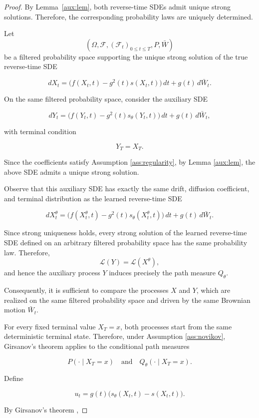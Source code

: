 \documentclass[11pt]{article}
\begin{document}
\begin{proof}
By Lemma~\ref{aux:lem}, both reverse-time SDEs admit unique strong
solutions. Therefore, the corresponding probability laws are uniquely determined. 

Let
\[
(\Omega,\mathcal{F},(\mathcal{F}_t)_{0\le t\le T},P,\bar{W})
\]
be a filtered probability space supporting the unique strong solution of the
true reverse-time SDE

\[
dX_t
=
\bigl(f(X_t,t)-g^2(t)s(X_t,t)\bigr)\,dt
+
g(t)\,d\bar{W}_t.
\]

On the same filtered probability space, consider the auxiliary SDE

\[
dY_t
=
\bigl(f(Y_t,t)-g^2(t)s_\theta(Y_t,t)\bigr)\,dt
+
g(t)\,d\bar{W}_t,
\]

with terminal condition

\[
Y_T=X_T.
\]

Since the coefficients satisfy Assumption \ref{ass:regularity}, by Lemma \ref{aux:lem}, the above SDE admits a unique
strong solution.

Observe that this auxiliary SDE has exactly the same drift, diffusion
coefficient, and terminal distribution as the learned reverse-time SDE

\[
dX_t^\theta
=
\bigl(f(X_t^\theta,t)-g^2(t)s_\theta(X_t^\theta,t)\bigr)\,dt
+
g(t)\,d\bar{W}_t.
\]

Since strong uniqueness holds, every strong solution of the learned
reverse-time SDE defined on an arbitrary filtered probability space has
the same probability law. Therefore,
\[
\mathcal{L}(Y)
=
\mathcal{L}(X^\theta),
\]
and hence the auxiliary process \(Y\) induces precisely the path measure
\(Q_\theta\).

Consequently, it is sufficient to compare the processes $X$ and $Y$, which
are realized on the same filtered probability space and driven by the same
Brownian motion $\bar{W}_t$.

For every fixed terminal value $X_T=x$, both processes start from the same
deterministic terminal state. Therefore, under Assumption \ref{ass:novikov}, Girsanov's theorem \cite[Theorem 8.6.4]{Oksendal2003} applies to the
conditional path measures

\[
P(\cdot\mid X_T=x)
\quad\text{and}\quad
Q_\theta(\cdot\mid X_T=x).
\]

Define

\[
u_t
=
g(t)\bigl(s_\theta(X_t,t)-s(X_t,t)\bigr).
\]

By Girsanov's theorem \cite[Theorem 8.6.4]{Oksendal2003},


\end{proof}
\end{document}
